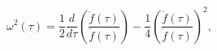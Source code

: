 \begin{equation}\label{Freq}
\omega^2(\tau)=\frac{1}{2}\frac{d}{d\tau} \left(\frac{\ddot
f(\tau)}{\dot f(\tau)}\right)- \frac{1}{4}\left(\frac{\ddot
f(\tau)}{\dot f(\tau)}\right)^2,
\end{equation}

